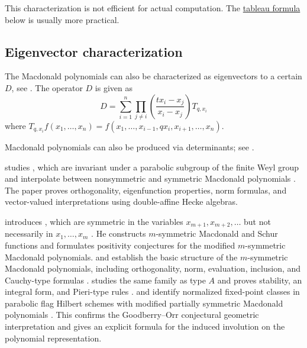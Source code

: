This characterization is not efficient for actual computation.  The
\hyperref[macdonaldPTableauFormula]{tableau formula} below is usually more practical.

\subsection[macdonaldPEigenvectors]{Eigenvector characterization}

The Macdonald polynomials can also be characterized as eigenvectors
to a certain \label{macdonaldDifferenceOperator}
$D$, see \cite{Macdonald1987}.
The operator $D$ is given as
\[
D
=
\sum_{i=1}^n
\prod_{j \neq i} \left( \frac{tx_i-x_j}{x_i-x_j} \right) T_{q,x_i}
\]
where
$T_{q,x_i} f(x_1,\dotsc,x_n)
= f(x_1,\dotsc,x_{i-1},qx_i,x_{i+1},\dotsc,x_n)$.

Macdonald polynomials can also be produced via determinants;
see \cite{LapointeLascouxMorse1998}.

 studies
\label{intermediateMacdonaldPolynomial},
which are
invariant under a parabolic subgroup of the finite Weyl group and interpolate
between nonsymmetric and symmetric Macdonald polynomials
\cite{Schlosser2026Macdonald}.  The paper proves orthogonality, eigenfunction
properties, norm formulas, and vector-valued interpretations using
double-affine Hecke algebras.

 introduces
\label{mSymmetricFunction}, which are symmetric in
the variables $x_{m+1},x_{m+2},\dotsc$ but not necessarily in
$x_1,\dotsc,x_m$ \cite{Lapointe2022x}.  He constructs $m$-symmetric
Macdonald and Schur functions and formulates positivity conjectures for the
modified $m$-symmetric Macdonald polynomials.   and
 establish the basic structure of the $m$-symmetric
Macdonald polynomials, including orthogonality, norm, evaluation, inclusion,
and Cauchy-type formulas \cite{ConchaLapointe2023Macdonald}.   studies the same family as type $A$
\label{partiallySymmetricMacdonaldPolynomial}
and proves stability, an integral form, and Pieri-type rules
\cite{Goodberry2025}.
 and 
identify normalized fixed-point classes in parabolic flag Hilbert schemes
with modified partially symmetric Macdonald polynomials
\cite{OrrWeising2024x}.  This confirms the Goodberry--Orr conjectural
geometric interpretation and gives an explicit formula for the induced
involution on the polynomial representation.

